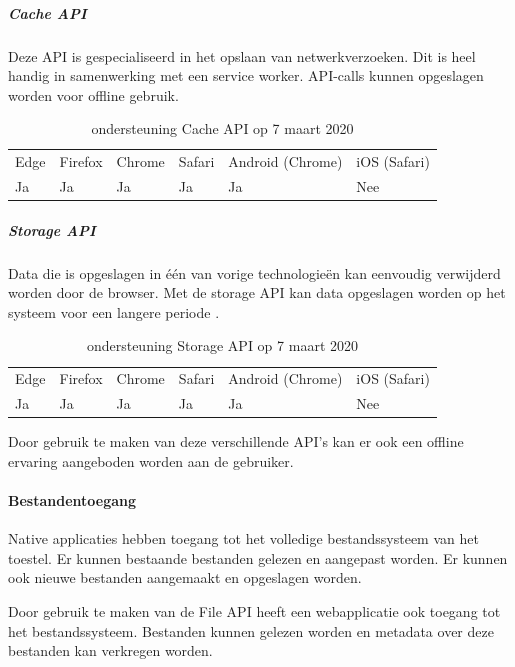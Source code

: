 		
		\subparagraph{Cache API}
		Deze API is gespecialiseerd in het opslaan van netwerkverzoeken. Dit is heel handig in samenwerking met een service worker. API-calls kunnen opgeslagen worden voor offline gebruik.
		\autocite{vanKesteren2008}
		
		\begin{table}[H]
			\centering
				\begin{tabular}{llllll}
					Edge & Firefox & Chrome & Safari & Android (Chrome) & iOS (Safari) \\
					Ja   & Ja      &  Ja     & Ja     & Ja               & Nee          
				\end{tabular}	
				\caption{ondersteuning Cache API op 7 maart 2020}
		\end{table}
		
		
		\subparagraph{Storage API}
		Data die is opgeslagen in één van vorige technologieën kan eenvoudig verwijderd worden door de browser. Met de storage API kan data opgeslagen worden op het systeem voor een langere periode .
		\autocite{Mozilla2020b}
		
		\begin{table}[H]
			\centering
			\begin{tabular}{llllll}
				Edge & Firefox & Chrome & Safari & Android (Chrome) & iOS (Safari) \\
				Ja   & Ja      &  Ja     & Ja     & Ja               & Nee          
			\end{tabular}	
			\caption{ondersteuning Storage API op 7 maart 2020}
		\end{table}
		
		
		
	Door gebruik te maken van deze verschillende API's kan er ook een offline ervaring aangeboden worden aan de gebruiker. 
		
	\paragraph{Bestandentoegang}
	
	Native applicaties hebben toegang tot het volledige bestandssysteem van het toestel. Er kunnen bestaande bestanden gelezen en aangepast worden. Er kunnen ook nieuwe bestanden aangemaakt en opgeslagen worden.
	
	Door gebruik te maken van de File API \autocite{Kruisselbrink2019} heeft een webapplicatie ook toegang tot het bestandssysteem. Bestanden kunnen gelezen worden en metadata over deze bestanden kan verkregen worden.
	
